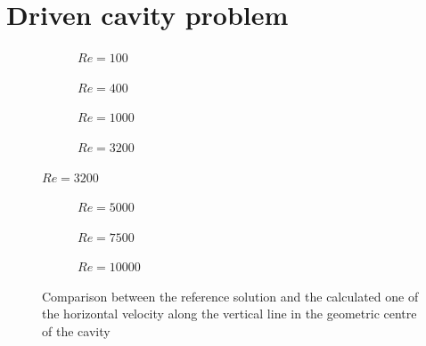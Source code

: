 \chapter{Driven cavity problem}
\begin{figure}[h]
	\centering
	\begin{subfigure}{0.5\textwidth}
		\resizebox{1.4\textwidth}{!}{}
		\caption{$Re=100$}
	\end{subfigure}%
	\begin{subfigure}{0.5\textwidth}
		\resizebox{1.4\textwidth}{!}{}
		\caption{$Re=400$}
	\end{subfigure}
	\begin{subfigure}{0.5\textwidth}
		\resizebox{1.4\textwidth}{!}{}
		\caption{$Re=1000$}
	\end{subfigure}%
	\begin{subfigure}{0.5\textwidth}
		\resizebox{1.4\textwidth}{!}{}
		\caption{$Re=3200$}
	\end{subfigure}
\end{figure}
\begin{figure}\ContinuedFloat
	\begin{subfigure}{0.5\textwidth}
		\resizebox{1.4\textwidth}{!}{}
		\caption{$Re=5000$}
	\end{subfigure}%
	\begin{subfigure}{0.5\textwidth}
		\resizebox{1.4\textwidth}{!}{}
		\caption{$Re=7500$}
	\end{subfigure}
	\begin{subfigure}{0.5\textwidth}
		\resizebox{1.4\textwidth}{!}{}
		\caption{$Re=10000$}
	\end{subfigure}
	\caption[Comparison between the reference solution and the calculated one of the horizontal velocity along the vertical line in the geometric center of the cavity]{Comparison between the reference solution and the calculated one of the horizontal velocity along the vertical line in the geometric centre of the cavity \cite{Ghia1982}}
\end{figure}

